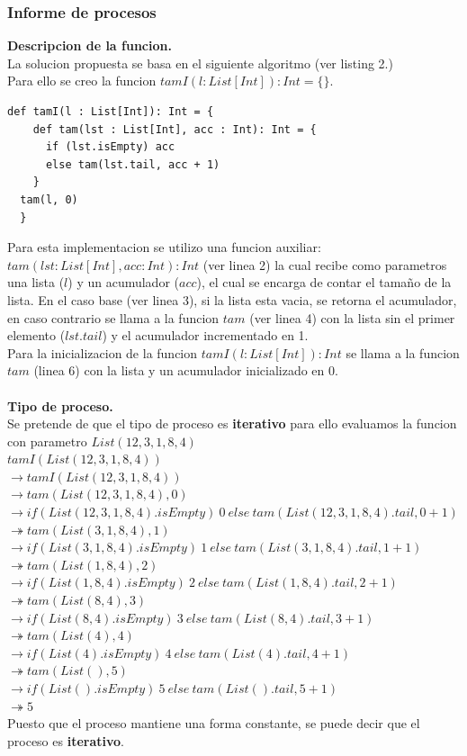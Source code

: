 \documentclass[12pt, a4paper]{article}
\begin{document}
\subsubsection{Informe de procesos}
\textbf{Descripcion de la funcion.}\\
La solucion propuesta se basa en el siguiente algoritmo (ver listing 2.) \\
Para ello se creo la funcion $tamI(l:List[Int]):Int = \{\}$.
\begin{lstlisting}[style=scalaStyle, caption=Calcula el tamaño de una lista con un proceso iterativo]
  def tamI(l : List[Int]): Int = {
    def tam(lst : List[Int], acc : Int): Int = {
      if (lst.isEmpty) acc
      else tam(lst.tail, acc + 1)
    }    
  tam(l, 0)
  } 
\end{lstlisting}
Para esta implementacion se utilizo una funcion auxiliar: \\ $tam(lst:List[Int], acc:Int):Int$ (ver linea 2) la cual recibe como parametros una lista ($l$) y un acumulador ($acc$), el cual se encarga de contar el tamaño de la lista.
En el caso base (ver linea 3), si la lista esta vacia, se retorna el acumulador, en caso contrario se llama a la funcion $tam$ (ver linea 4) con la lista sin el primer elemento ($lst.tail$) y el acumulador incrementado en 1. \\
Para la inicializacion de la funcion $tamI(l:List[Int]):Int$ se llama a la funcion $tam$ (linea 6) con la lista y un acumulador inicializado en 0.\\ \\
\textbf{Tipo de proceso.}\\
Se pretende de que el tipo de proceso es \textbf{iterativo} para ello evaluamos la funcion con parametro $List(12, 3, 1, 8, 4)$ \\
$tamI(List(12, 3, 1, 8, 4))$\\
$\rightarrow  tamI(List(12, 3, 1, 8, 4))$ \\
$\rightarrow tam(List(12,3,1,8,4),0)$\\
$\rightarrow if(List(12,3,1,8,4).isEmpty) ~0 ~else ~tam(List(12,3,1,8,4).tail,0+1)$ \\
$\twoheadrightarrow tam(List(3,1,8,4),1)$\\
$\rightarrow if(List(3,1,8,4).isEmpty) ~1 ~else ~tam(List(3,1,8,4).tail,1+1)$ \\
$\twoheadrightarrow tam(List(1,8,4),2)$\\
$\rightarrow if(List(1,8,4).isEmpty) ~2 ~else ~tam(List(1,8,4).tail,2+1)$ \\
$\twoheadrightarrow tam(List(8,4),3)$\\
$\rightarrow if(List(8,4).isEmpty) ~3 ~else ~tam(List(8,4).tail,3+1)$ \\
$\twoheadrightarrow tam(List(4),4)$\\
$\rightarrow if(List(4).isEmpty) ~4 ~else ~tam(List(4).tail,4+1)$ \\
$\twoheadrightarrow tam(List(),5)$\\
$\rightarrow if(List().isEmpty) ~5 ~else ~tam(List().tail,5+1)$ \\
$\twoheadrightarrow 5$\\
Puesto que el proceso mantiene una forma constante, se puede decir que el proceso es \textbf{iterativo}.
\end{document}
